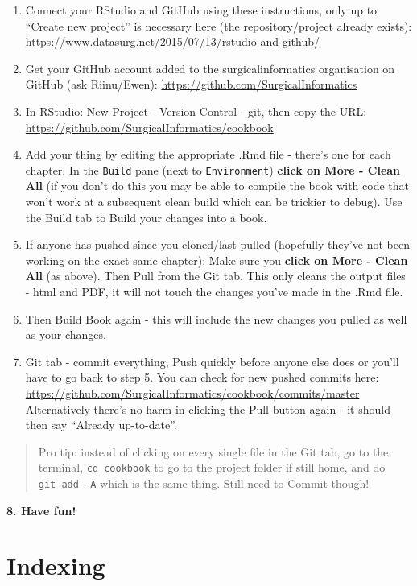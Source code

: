 \documentclass[]{book}
\begin{document}
\begin{enumerate}
\def\labelenumi{\arabic{enumi}.}
\item
  Connect your RStudio and GitHub using these instructions, only up to ``Create new project'' is necessary here (the repository/project already exists):
  \url{https://www.datasurg.net/2015/07/13/rstudio-and-github/}
\item
  Get your GitHub account added to the surgicalinformatics organisation on GitHub (ask Riinu/Ewen):
  \url{https://github.com/SurgicalInformatics}
\item
  In RStudio: New Project - Version Control - git, then copy the URL: \url{https://github.com/SurgicalInformatics/cookbook}
\item
  Add your thing by editing the appropriate .Rmd file - there's one for each chapter. In the \texttt{Build} pane (next to \texttt{Environment}) \textbf{click on More - Clean All} (if you don't do this you may be able to compile the book with code that won't work at a subsequent clean build which can be trickier to debug). Use the Build tab to Build your changes into a book.
\item
  If anyone has pushed since you cloned/last pulled (hopefully they've not been working on the exact same chapter): Make sure you \textbf{click on More - Clean All} (as above). Then Pull from the Git tab. This only cleans the output files - html and PDF, it will not touch the changes you've made in the .Rmd file.
\item
  Then Build Book again - this will include the new changes you pulled as well as your changes.
\item
  Git tab - commit everything, Push quickly before anyone else does or you'll have to go back to step 5. You can check for new pushed commits here: \url{https://github.com/SurgicalInformatics/cookbook/commits/master} Alternatively there's no harm in clicking the Pull button again - it should then say ``Already up-to-date''.
\end{enumerate}

\begin{quote}
Pro tip: instead of clicking on every single file in the Git tab, go to the terminal, \texttt{cd\ cookbook} to go to the project folder if still home, and do \texttt{git\ add\ -A} which is the same thing. Still need to Commit though!
\end{quote}

\textbf{8. Have fun!}

\hypertarget{indexing}{%
\section{Indexing}\label{indexing}}
\end{document}

